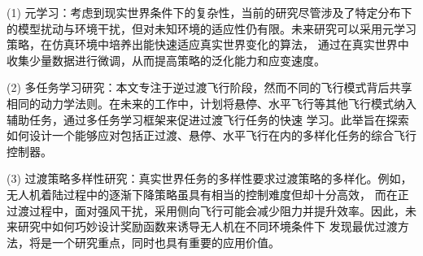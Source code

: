     (1) 元学习：考虑到现实世界条件下的复杂性，当前的研究尽管涉及了特定分布下的模型扰动与环境干扰，但对未知环境的适应性仍有限。未来研究可以采用元学习策略，在仿真环境中培养出能快速适应真实世界变化的算法，
    通过在真实世界中收集少量数据进行微调，从而提高策略的泛化能力和应变速度。
    
    (2) 多任务学习研究：本文专注于逆过渡飞行阶段，然而不同的飞行模式背后共享相同的动力学法则。在未来的工作中，计划将悬停、水平飞行等其他飞行模式纳入辅助任务，通过多任务学习框架来促进过渡飞行任务的快速
    学习。此举旨在探索如何设计一个能够应对包括正过渡、悬停、水平飞行在内的多样化任务的综合飞行控制器。
    
    (3) 过渡策略多样性研究：真实世界任务的多样性要求过渡策略的多样化。例如，无人机着陆过程中的逐渐下降策略虽具有相当的控制难度但却十分高效，
    而在正过渡过程中，面对强风干扰，采用侧向飞行可能会减少阻力并提升效率。因此，未来研究中如何巧妙设计奖励函数来诱导无人机在不同环境条件下
    发现最优过渡方法，将是一个研究重点，同时也具有重要的应用价值。



